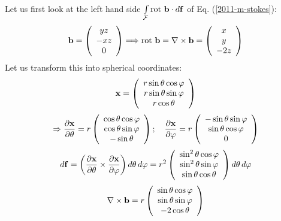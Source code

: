 {\begin{enumerate}
Let us first look at the left hand side $\int \limits_{\cal F} \textrm{rot } {\bf b} \cdot d{\bf f} $
of Eq. (\ref{2011-m-stokes}):
$$
  {\bf b}=
  \left(
    \begin{array}{c}
      yz \\
      -xz \\
      0
    \end{array}
  \right)
  \Longrightarrow
  \textrm{rot } {\bf b} = \nabla \times {\bf b} =
  \left(
    \begin{array}{c}
      x \\
      y \\
      -2z
    \end{array}
  \right)
$$
Let us transform this into spherical coordinates:
$$
  {\bf x}=
  \left(
    \begin{array}{c}
      r\sin \theta \cos \varphi \\
      r\sin \theta \sin \varphi \\
      r\cos \theta
    \end{array}
  \right)
$$
$$
  \Rightarrow
  \frac{\partial {\bf x}}{\partial \theta}=
  r
  \left(
    \begin{array}{c}
      \cos \theta \cos \varphi \\
      \cos \theta \sin \varphi \\
      -\sin \theta
    \end{array}
  \right);\quad
  \frac{\partial {\bf x}}{\partial \varphi}=
  r
  \left(
    \begin{array}{c}
      -\sin \theta \sin \varphi \\
      \sin \theta \cos \varphi \\
      0
    \end{array}
  \right)
$$
$$
  d{\bf f}=
  \left(
    \frac{\partial {\bf x}}{\partial \theta} \times
    \frac{\partial {\bf x}}{\partial \varphi}
  \right)
  d\theta \, d\varphi=
  r^2
  \left(
    \begin{array}{c}
      \sin^2 \theta \cos \varphi \\
      \sin^2 \theta \sin \varphi \\
      \sin \theta \cos \theta
    \end{array}
  \right)
  d\theta \, d\varphi \label{eqn:1.14.1}
$$
$$
  \nabla \times {\bf b}=
  r
  \left(
    \begin{array}{c}
      \sin \theta \cos \varphi \\
      \sin \theta \sin \varphi \\
      -2\cos \theta
    \end{array}
  \right)
$$


\end{enumerate}}

